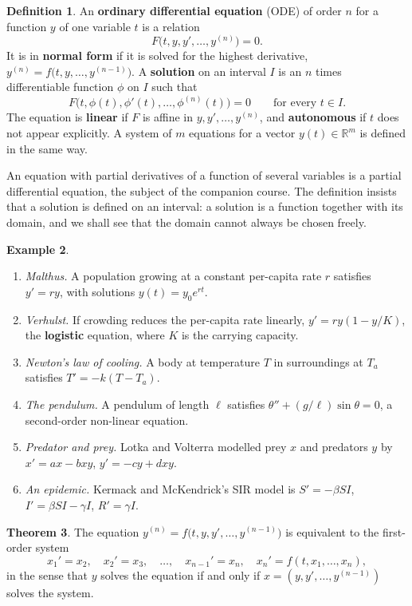 \documentclass[11pt,a4paper]{article}
\numberwithin{equation}{section}
\theoremstyle{definition}
\newtheorem{thm}{Theorem}[subsection]
\newtheorem{defn}[thm]{Definition}
\newtheorem{exa}[thm]{Example}
\begin{document}
\begin{defn}
An \textbf{ordinary differential equation} (ODE) of order $n$ for a function $y$ of one variable $t$ is a relation
\[
F\bigl(t, y, y', \dots, y^{(n)}\bigr) = 0 .
\]
It is in \textbf{normal form} if it is solved for the highest derivative, $y^{(n)} = f\bigl(t, y, \dots, y^{(n-1)}\bigr)$. A \textbf{solution} on an interval $I$ is an $n$ times
differentiable function $\phi$ on $I$ such that
\[
F\bigl(t, \phi(t), \phi'(t), \dots, \phi^{(n)}(t)\bigr) = 0 \qquad\text{for every } t \in I .
\] The equation is \textbf{linear} if $F$ is affine in $y, y', \dots, y^{(n)}$, and
\textbf{autonomous} if $t$ does not appear explicitly. A system of $m$ equations for a vector $y(t) \in \mathbb R^m$ is defined in the same way.
\end{defn}

An equation with partial derivatives of a function of several variables is a partial differential equation, the subject of the companion course.
The definition insists that a solution is defined on an interval: a solution is a function together with its domain, and we shall see that the
domain cannot always be chosen freely.

\begin{exa}
\label{ex:models}
\begin{enumerate}[label=(\alph*)]
\item \emph{Malthus.} A population growing at a constant per-capita rate $r$ satisfies $y' = ry$, with solutions $y(t) = y_0e^{rt}$.
\item \emph{Verhulst.} If crowding reduces the per-capita rate linearly, $y' = ry(1 - y/K)$, the \textbf{logistic} equation, where $K$ is the carrying capacity.
\item \emph{Newton's law of cooling.} A body at temperature $T$ in surroundings at $T_a$ satisfies $T' = -k(T - T_a)$.
\item \emph{The pendulum.} A pendulum of length $\ell$ satisfies $\theta'' + (g/\ell)\sin\theta = 0$, a second-order non-linear equation.
\item \emph{Predator and prey.} Lotka and Volterra modelled prey $x$ and predators $y$ by $x' = ax - bxy$, $y' = -cy + dxy$.
\item \emph{An epidemic.} Kermack and McKendrick's SIR model is $S' = -\beta SI$, $I' = \beta SI - \gamma I$, $R' = \gamma I$.
\end{enumerate}
\end{exa}

\begin{thm}
\label{thm:reduction}
The equation $y^{(n)} = f\bigl(t, y, y', \dots, y^{(n-1)}\bigr)$ is equivalent to the first-order system
\[
x_1' = x_2, \quad x_2' = x_3, \quad \dots, \quad x_{n-1}' = x_n, \quad x_n' = f(t, x_1, \dots, x_n),
\]
in the sense that $y$ solves the equation if and only if $x = (y, y', \dots, y^{(n-1)})$ solves the system.
\end{thm}
\end{document}
